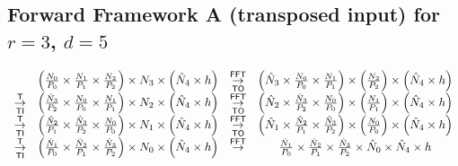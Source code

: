 \subsection{Forward Framework A (transposed input) for \texorpdfstring{$r=3$, $d=5$}{r=3 and d=5}}
\setlength{\arraycolsep}{2pt}
\begin{equation*}
  \begin{array}{cccc}
    & \left(\frac{N_0}{P_0} \times \frac{N_1}{P_1}  \times \frac{N_2}{P_2}\right) \times N_3 \times \left(\hat N_4 \times h\right)
    & \overset{\textsf{FFT}}{\underset{\textsf{TO}}{\rightarrow}} & \left(\hat N_3 \times \frac{N_0}{P_0} \times \frac{N_1}{P_1}\right) \times \left(\frac{N_2}{P_2}\right) \times \left(\hat N_4 \times h\right) \\
    \overset{\textsf{T}}{\underset{\textsf{TI}}{\rightarrow}} & \left(\frac{\hat N_3}{P_2} \times \frac{N_0}{P_0} \times \frac{N_1}{P_1}\right)  \times N_2 \times \left(\hat N_4 \times h\right)
    & \overset{\textsf{FFT}}{\underset{\textsf{TO}}{\rightarrow}} & \left(\hat N_2 \times \frac{\hat N_3}{P_2} \times \frac{N_0}{P_0}\right) \times \left(\frac{N_1}{P_1}\right) \times \left(\hat N_4 \times h\right) \\
    \overset{\textsf{T}}{\underset{\textsf{TI}}{\rightarrow}} & \left(\frac{\hat N_2}{P_1} \times \frac{\hat N_3}{P_2} \times \frac{N_0}{P_0}\right) \times N_1 \times \left(\hat N_4 \times h\right)
    & \overset{\textsf{FFT}}{\underset{\textsf{TO}}{\rightarrow}} & \left(\hat N_1 \times \frac{\hat N_2}{P_1} \times \frac{\hat N_3}{P_2}\right) \times \left(\frac{N_0}{P_0}\right) \times \left(\hat N_4 \times h\right) \\
    \overset{\textsf{T}}{\underset{\textsf{TI}}{\rightarrow}} & \left(\frac{\hat N_1}{P_0} \times \frac{\hat N_2}{P_1} \times \frac{\hat N_3}{P_2}\right) \times N_0 \times \left(\hat N_4 \times h\right)
    & \overset{\textsf{FFT}}{\rightarrow} & \frac{\hat N_1}{P_0} \times \frac{\hat N_2}{P_1} \times \frac{\hat N_3}{P_2} \times \hat N_0 \times \hat N_4 \times h
  \end{array}
\end{equation*}

